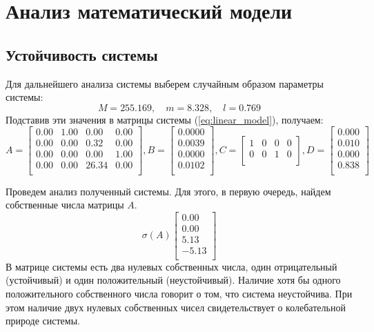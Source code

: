 \section{Анализ математический модели}
\subsection{Устойчивость системы} 
Для дальнейшего анализа системы выберем случайным образом параметры системы:
\begin{equation}
    M = 255.169,\quad m = 8.328,\quad l = 0.769
\end{equation}
Подставив эти значения в матрицы системы (\ref{eq:linear_model}), получаем: 
\begin{equation}
    A = \begin{bmatrix}
    0.00  & 1.00  & 0.00  & 0.00 \\ 
    0.00  & 0.00  & 0.32  & 0.00 \\ 
    0.00  & 0.00  & 0.00  & 1.00 \\ 
    0.00  & 0.00  & 26.34  & 0.00 \\ 
    \end{bmatrix},
    B = \begin{bmatrix}
    0.0000 \\ 
    0.0039 \\ 
    0.0000 \\ 
    0.0102 \\ 
    \end{bmatrix},
    C = \begin{bmatrix}
    1  & 0  & 0  & 0 \\ 
    0  & 0  & 1  & 0 \\ 
    \end{bmatrix},
    D = \begin{bmatrix}
    0.000 \\ 
    0.010 \\ 
    0.000 \\ 
    0.838 \\ 
    \end{bmatrix}
\end{equation}

Проведем анализ полученный системы. Для этого, в первую очередь, найдем собственные числа матрицы $A$. 
\begin{equation}
    \sigma(A) \begin{bmatrix}
    0.00 \\ 
    0.00 \\ 
    5.13 \\ 
    -5.13 \\ 
    \end{bmatrix}
\end{equation}
В матрице системы есть два нулевых собственных числа, один отрицательный (устойчивый) и один положительный (неустойчивый). 
Наличие хотя бы одного положительного собственного числа говорит о том, что система неустойчива. При этом 
наличие двух нулевых собственных чисел свидетельствует о колебательной природе системы. 

